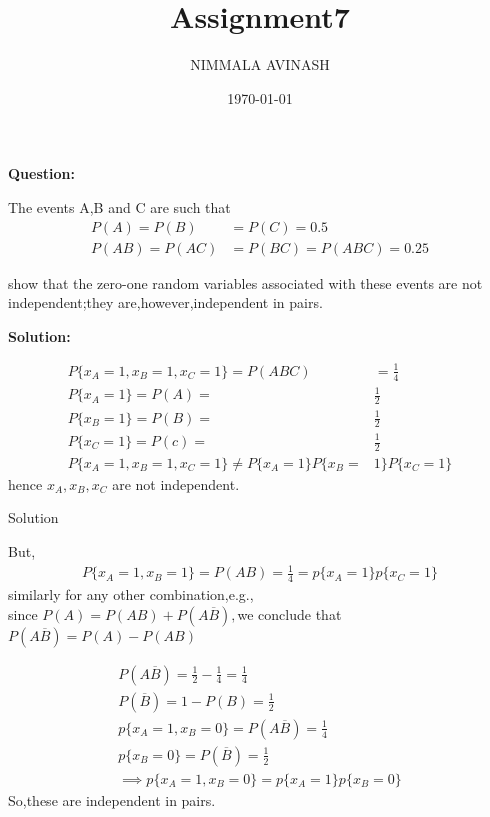 \documentclass{beamer}
\title{Assignment7}
\author{NIMMALA AVINASH}
\institute{IITH}
\date{\today}
\begin{document}
\maketitle
\begin{frame}
{\LARGE \textbf{Question:\\}}
\begin{large}
The events A,B and C are such that \\
\begin{align}
P(A)=P(B)&=P(C)=0.5\\
P(AB)=P(AC)&=P(BC)=P(ABC)=0.25
\end{align}

show that the zero-one random variables associated with these events are not independent;they are,however,independent in pairs.\\
\end{large}
\end{frame}
\begin{frame}
{\LARGE \textbf{Solution:\\}}
\begin{large}
\begin{align}
P\{x_{A}=1,x_{B}=1,x_{C}=1\} = P(ABC)&=\frac{1}{4}\\
P\{x_{A}=1\} = P(A) =&\frac{1}{2}\\ P\{x_{B}=1\} = P(B) =& \frac{1}{2}\\
P\{x_{C}=1\}=P(c)=&\frac{1}{2}\\
P\{x_{A}=1,x_{B}=1,x_{C}=1\}\neq P\{x_{A}=1\}P\{x_{B}=&1\}P\{x_{C}=1\}
\end{align}
hence $ x_{A},x_{B},x_{C}$ are not independent.\\
\end{large}
\end{frame}
\begin{frame}{Solution}
\begin{large}
But,\\
\begin{align}
P\{x_{A}=1,x_{B}=1\}=P(AB)=\frac{1}{4}=p\{x_{A}=1\}p\{x_{C}=1\}
\end{align}
similarly for any other combination,e.g.,\\since
$ P(A) = P(AB)+P(A\overline{B}),$we conclude that\\
$P(A\overline{B}) = P(A) - P(AB)$\\
\end{large}
\end{frame}
\begin{frame}
\begin{large}
\begin{align}
P(A\overline{B})=\frac{1}{2}-\frac{1}{4} = \frac{1}{4}\\
P(\overline{B})=1-P(B)=\frac{1}{2}\\
p\{x_{A}=1,x_{B}=0\}=P(A\overline{B})=\frac{1}{4}\\
p\{x_{B}=0\}=P(\overline{B})=\frac{1}{2} \\
\implies p\{x_{A}=1,x_{B}=0\}=p\{x_{A}=1\}p\{x_{B}=0\}
\end{align}
So,these are independent in pairs.\\
\end{large}
\end{frame}
\end{document}
